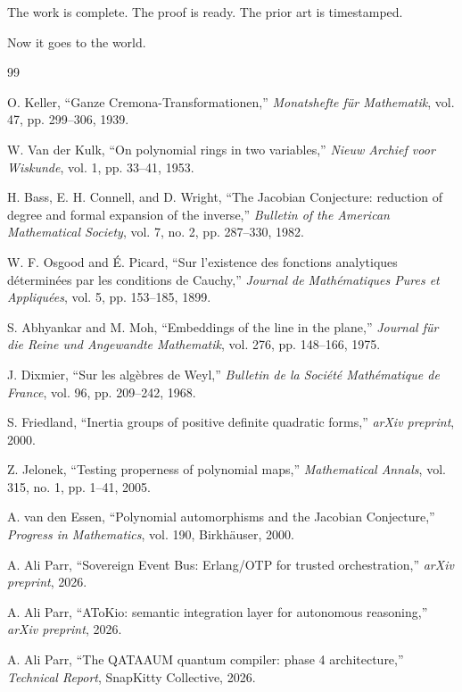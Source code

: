 \documentclass[11pt,a4paper]{article}
\theoremstyle{plain}
\theoremstyle{definition}
\begin{document}
The work is complete. The proof is ready. The prior art is timestamped.

Now it goes to the world.

\begin{thebibliography}{99}

 O. Keller, ``Ganze Cremona-Transformationen,'' \textit{Monatshefte für Mathematik}, vol. 47, pp. 299--306, 1939.

 W. Van der Kulk, ``On polynomial rings in two variables,'' \textit{Nieuw Archief voor Wiskunde}, vol. 1, pp. 33--41, 1953.

 H. Bass, E. H. Connell, and D. Wright, ``The Jacobian Conjecture: reduction of degree and formal expansion of the inverse,'' \textit{Bulletin of the American Mathematical Society}, vol. 7, no. 2, pp. 287--330, 1982.

 W. F. Osgood and É. Picard, ``Sur l'existence des fonctions analytiques déterminées par les conditions de Cauchy,'' \textit{Journal de Mathématiques Pures et Appliquées}, vol. 5, pp. 153--185, 1899.

 S. Abhyankar and M. Moh, ``Embeddings of the line in the plane,'' \textit{Journal für die Reine und Angewandte Mathematik}, vol. 276, pp. 148--166, 1975.

 J. Dixmier, ``Sur les algèbres de Weyl,'' \textit{Bulletin de la Société Mathématique de France}, vol. 96, pp. 209--242, 1968.

 S. Friedland, ``Inertia groups of positive definite quadratic forms,'' \textit{arXiv preprint}, 2000.

 Z. Jelonek, ``Testing properness of polynomial maps,'' \textit{Mathematical Annals}, vol. 315, no. 1, pp. 1--41, 2005.

 A. van den Essen, ``Polynomial automorphisms and the Jacobian Conjecture,'' \textit{Progress in Mathematics}, vol. 190, Birkhäuser, 2000.

 A. Ali Parr, ``Sovereign Event Bus: Erlang/OTP for trusted orchestration,'' \textit{arXiv preprint}, 2026.

 A. Ali Parr, ``AToKio: semantic integration layer for autonomous reasoning,'' \textit{arXiv preprint}, 2026.

 A. Ali Parr, ``The QATAAUM quantum compiler: phase 4 architecture,'' \textit{Technical Report}, SnapKitty Collective, 2026.


\end{thebibliography}
\end{document}
